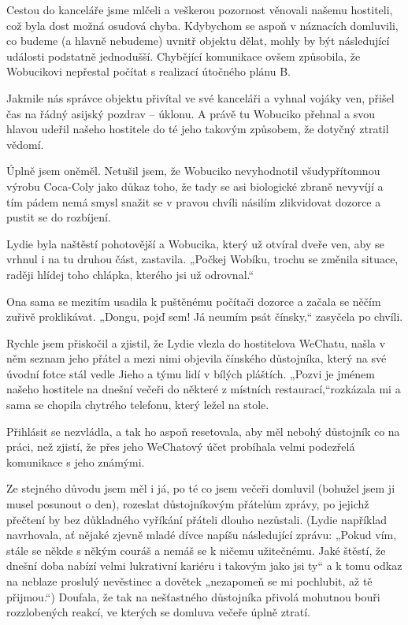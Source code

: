 Cestou do kanceláře jsme mlčeli a veškerou pozornost věnovali našemu hostiteli, což byla dost možná osudová chyba. Kdybychom se aspoň v náznacích domluvili, co budeme (a hlavně nebudeme) uvnitř objektu dělat, mohly by být následující události podstatně jednodušší. Chybějící komunikace ovšem způsobila, že Wobucikovi nepřestal počítat s realizací útočného plánu B.

Jakmile nás správce objektu přivítal ve své kanceláři a vyhnal vojáky ven, přišel čas na řádný asijský pozdrav – úklonu. A právě tu Wobuciko přehnal a svou hlavou udeřil našeho hostitele do té jeho takovým způsobem, že dotyčný ztratil vědomí. 

Úplně jsem oněměl. Netušil jsem, že Wobuciko nevyhodnotil všudypřítomnou výrobu Coca-Coly jako důkaz toho, že tady se asi biologické zbraně nevyvíjí a tím pádem nemá smysl snažit se v pravou chvíli násilím zlikvidovat dozorce a pustit se do rozbíjení.

Lydie byla naštěstí pohotovější a Wobucika, který už otvíral dveře ven, aby se vrhnul i na tu druhou část, zastavila. „Počkej Wobíku, trochu se změnila situace, raději hlídej toho chlápka, kterého jsi už odrovnal.“

Ona sama se mezitím usadila k puštěnému počítači dozorce a začala se něčím zuřivě proklikávat. „Dongu, pojď sem! Já neumím psát čínsky,“ zasyčela po chvíli.

Rychle jsem přiskočil a zjistil, že Lydie vlezla do hostitelova WeChatu, našla v něm seznam jeho přátel a mezi nimi objevila čínského důstojníka, který na své úvodní fotce stál vedle Jieho a týmu lidí v bílých pláštích. „Pozvi je jménem našeho hostitele na dnešní večeři do některé z místních restaurací,“rozkázala mi a sama se chopila chytrého telefonu, který ležel na stole. 

Přihlásit se nezvládla, a tak ho aspoň resetovala, aby měl nebohý důstojník co na práci, než zjistí, že přes jeho WeChatový účet probíhala velmi podezřelá komunikace s jeho známými.

Ze stejného důvodu jsem měl i já, po té co jsem večeři domluvil (bohužel jsem ji musel posunout o den), rozeslat důstojníkovým přátelům zprávy, po jejichž přečtení by bez důkladného vyříkání přáteli dlouho nezůstali. (Lydie například navrhovala, ať nějaké zjevně mladé dívce napíšu následující zprávu: „Pokud vím, stále se někde s někým couráš a nemáš se k ničemu užitečnému. Jaké štěstí, že dnešní doba nabízí velmi lukrativní kariéru i takovým jako jsi ty“ a k tomu odkaz na neblaze proslulý nevěstinec a dovětek „nezapomeň se mi pochlubit, až tě přijmou.“) Doufala, že tak na nešťastného důstojníka přivolá mohutnou bouři rozzlobených reakcí, ve kterých se domluva večeře  úplně ztratí.

